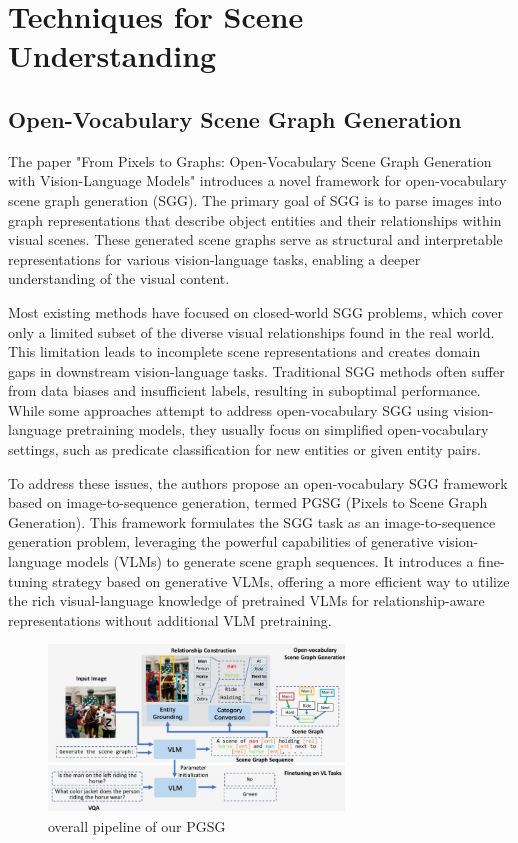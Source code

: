 \section{Techniques for Scene Understanding}
\label{sec:formatting}




\subsection{Open-Vocabulary Scene Graph Generation}


The paper "From Pixels to Graphs: Open-Vocabulary Scene Graph Generation with Vision-Language Models" introduces a novel framework for open-vocabulary scene graph generation (SGG). The primary goal of SGG is to parse images into graph representations that describe object entities and their relationships within visual scenes. These generated scene graphs serve as structural and interpretable representations for various vision-language tasks, enabling a deeper understanding of the visual content.

Most existing methods have focused on closed-world SGG problems, which cover only a limited subset of the diverse visual relationships found in the real world. This limitation leads to incomplete scene representations and creates domain gaps in downstream vision-language tasks. Traditional SGG methods often suffer from data biases and insufficient labels, resulting in suboptimal performance. While some approaches attempt to address open-vocabulary SGG using vision-language pretraining models, they usually focus on simplified open-vocabulary settings, such as predicate classification for new entities or given entity pairs.


To address these issues, the authors propose an open-vocabulary SGG framework based on image-to-sequence generation, termed PGSG (Pixels to Scene Graph Generation). This framework formulates the SGG task as an image-to-sequence generation problem, leveraging the powerful capabilities of generative vision-language models (VLMs) to generate scene graph sequences. It introduces a fine-tuning strategy based on generative VLMs, offering a more efficient way to utilize the rich visual-language knowledge of pretrained VLMs for relationship-aware representations without additional VLM pretraining.



\begin{figure}[h]
  \centering
  \includegraphics[width=0.7\textwidth]{img/pgsg.jpg}
  \caption{overall pipeline of our PGSG}
\end{figure}



